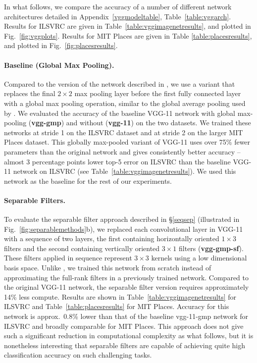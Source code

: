 \documentclass[thesis]{subfiles}
\begin{document}
    In what follows, we compare the accuracy of a number of different network architectures detailed in Appendix~\ref{vggmodeltable}, Table~\ref{table:vggarch}. Results for ILSVRC are given in Table~\ref{table:vggimagenetresults}, and plotted in Fig.~\ref{fig:vggplots}. Results for MIT Places are given in Table \ref{table:placesresults}, and plotted in Fig.~\ref{fig:placesresults}. 
    
    \paragraph{Baseline (Global Max Pooling).}  Compared to the version of the network described in \citep{journals/corr/SimonyanZ14a}, we use a variant that replaces the final $2 \times 2$ max pooling layer before the first fully connected layer with a global max pooling operation, similar to the global average pooling used by \citet{journals/corr/LinCY13,journals/corr/SzegedyLJSRAEVR14}. We evaluated the accuracy of the baseline VGG-11 network with global max-pooling (\textbf{vgg-gmp}) and without (\textbf{vgg-11}) on the two datasets. We trained these networks at stride 1 on the ILSVRC dataset and at stride 2 on the larger MIT Places dataset. This globally max-pooled variant of VGG-11 uses over 75\% fewer parameters than the original network and gives consistently better accuracy -- almost 3 percentage points lower top-5 error on ILSVRC than the baseline VGG-11 network on ILSVRC (see Table~\ref{table:vggimagenetresults}). We used this network as the baseline for the rest of our experiments.
    
    
    \paragraph{Separable Filters.} To evaluate the separable filter approach described in \S \ref{seqsep} (illustrated in Fig.~\ref{fig:separablemethods}b), we replaced each convolutional layer in VGG-11 with a sequence of two layers, the first containing horizontally oriented $1 \times 3$ filters and the second containing vertically oriented $3 \times 1$ filters (\textbf{vgg-gmp-sf}). These filters applied in sequence represent $3 \times 3$ kernels using a low dimensional basis space. Unlike \citet{journals/corr/JaderbergVZ14}, we trained this network from scratch instead of approximating the full-rank filters in a previously trained network. Compared to the original VGG-11 network, the separable filter version requires approximately 14\% less compute. Results are shown in Table~\ref{table:vggimagenetresults} for ILSVRC and Table~\ref{table:placesresults} for MIT Places. Accuracy for this network is approx.~0.8\% lower than that of the baseline vgg-11-gmp network for ILSVRC and broadly comparable for MIT Places. This approach does not give such a significant reduction in computational complexity as what follows, but it is nonetheless interesting that separable  filters are capable of achieving quite high classification accuracy on such challenging tasks.
    
\end{document}

